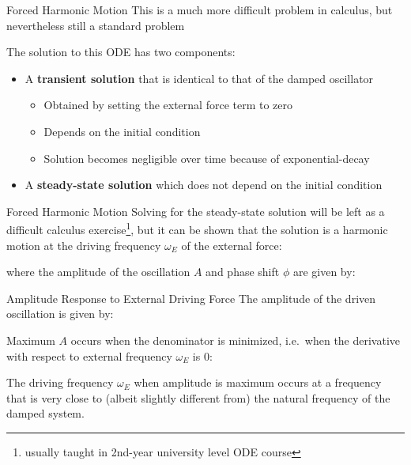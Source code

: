 \documentclass[12pt,compress,aspectratio=169]{beamer}
\begin{document}
\begin{frame}{Forced Harmonic Motion}
  This is a much more difficult problem in calculus, but nevertheless still a
  standard problem
  
  
  The solution to this ODE has two components:
  \begin{itemize}
  \item A \textbf{transient solution} that is identical to that of the damped
    oscillator
    \begin{itemize}
    \item Obtained by setting the external force term to zero
    \item Depends on the initial condition
    \item Solution becomes negligible over time because of exponential-decay
    \end{itemize}
  \item A \textbf{steady-state solution} which does not depend on the initial
    condition
  \end{itemize}
\end{frame}



\begin{frame}{Forced Harmonic Motion}
  Solving for the steady-state solution will be left as a difficult calculus
  exercise\footnote{usually taught in 2nd-year university level ODE course},
  but it can be shown that the solution is a harmonic motion at the driving
  frequency $\omega_E$ of the external force:

  
  where the amplitude of the oscillation $A$ and phase shift $\phi$ are given
  by:

  \vspace{.3in}
\end{frame}



\begin{frame}{Amplitude Response to External Driving Force}
  The amplitude of the driven oscillation is given by:
  
  
  Maximum $A$ occurs when the denominator is minimized, i.e.\ when the
  derivative with respect to external frequency $\omega_E$ is 0:


  The driving frequency $\omega_E$ when amplitude is maximum occurs at a
  frequency that is very close to (albeit slightly different from) the natural
  frequency of the damped system.
\end{frame}
\end{document}
